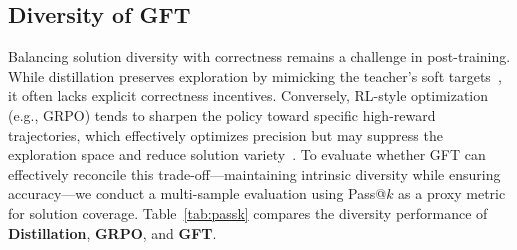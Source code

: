 




\subsection{Diversity of GFT}
\label{sec:analysis_diversity}

Balancing solution diversity with correctness remains a challenge in post-training. While distillation preserves exploration by mimicking the teacher's soft targets~\cite{goyal2025distilled}, it often lacks explicit correctness incentives. Conversely, RL-style optimization (e.g., GRPO) tends to sharpen the policy toward specific high-reward trajectories, which effectively optimizes precision but may suppress the exploration space and reduce solution variety~\cite{yue2025does}. To evaluate whether GFT can effectively reconcile this trade-off—maintaining intrinsic diversity while ensuring accuracy—we conduct a multi-sample evaluation using Pass@$k$ as a proxy metric for solution coverage. Table~\ref{tab:passk} compares the diversity performance of \textbf{Distillation}, \textbf{GRPO}, and \textbf{GFT}.


